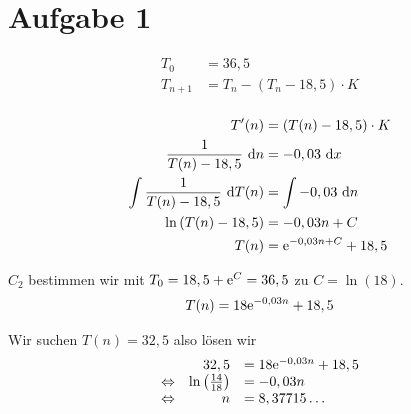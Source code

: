 \documentclass[main.tex]{subfiles}
\begin{document}
\section*{Aufgabe 1}
\begin{align*}
    T_0 &= 36,5 \\
    T_{n+1} &= T_n - \left(T_{n} - 18,5\right) \cdot K \\
\end{align*}

\begin{align*}
        T'(n) &= (T(n) - 18,5)\cdot K \\
        \frac{1}{T(n) - 18,5} ~\mathrm{d}n &= -0,03 ~\mathrm{d}x \\
        \int \frac{1}{T(n) - 18,5} ~\mathrm{d}T(n) &= \int -0,03 ~\mathrm{d}n \\
        \ln \left(T(n) - 18,5\right)  &= -0,03n + C \\
        T(n) &= \mathrm{e}^{-0,03n + C} + 18,5 \\
\end{align*}

$C_2$ bestimmen wir mit $T_0 = 18,5 + \mathrm{e}^{C} = 36,5$ zu $C = \ln (18)$.
\begin{align}
    T(n) &= 18\mathrm{e}^{-0,03n} + 18,5 \\
\end{align}


Wir suchen $T(n) = 32,5$ also lösen wir
\begin{equation*}
    \begin{array}{rrl}
            & 32,5 &= 18\mathrm{e}^{-0,03n} + 18,5 \\
        \Leftrightarrow & \ln \left( \frac{14}{18} \right) &= -0,03n \\
        \Leftrightarrow & n &= 8,37715\ldots \\        
    \end{array}
\end{equation*}
\end{document}
